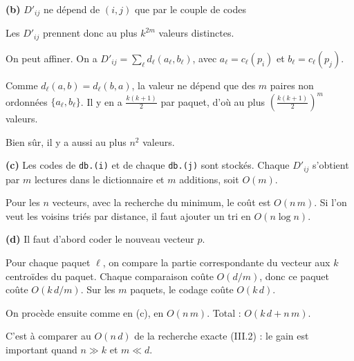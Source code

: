\documentclass[11pt,a4paper]{article}
\newcommand{\equationajustee}[1]{%
  \sbox{\boiteequation}{$\displaystyle #1$}%
  \ifdim\wd\boiteequation>\linewidth
    \[\resizebox{\linewidth}{!}{\usebox{\boiteequation}}\]%
  \else
    \[#1\]%
  \fi}
\begin{document}
\textbf{(b)} \(D'_{ij}\) ne dépend de \((i,j)\) que par le couple de codes

\equationajustee{\big(q(p_i),q(p_j)\big)\in[k]^m\times[k]^m.}

Les \(D'_{ij}\) prennent donc au plus \(\boxed{k^{2m}}\) valeurs distinctes.

On peut affiner. On a \(D'_{ij}=\sum_\ell d_\ell(a_\ell,b_\ell)\), avec \(a_\ell=c_\ell(p_i)\) et \(b_\ell=c_\ell(p_j)\).

Comme \(d_\ell(a,b)=d_\ell(b,a)\), la valeur ne dépend que des \(m\) paires non ordonnées \(\{a_\ell,b_\ell\}\). Il y en a \(\frac{k(k+1)}2\) par paquet, d'où au plus \(\left(\frac{k(k+1)}{2}\right)^m\) valeurs.

Bien sûr, il y a aussi au plus \(n^2\) valeurs.

\textbf{(c)} Les codes de \texttt{db.(i)} et de chaque \texttt{db.(j)} sont stockés. Chaque \(D'_{ij}\) s'obtient par \(m\) lectures dans le dictionnaire et \(m\) additions, soit \(O(m)\).

Pour les \(n\) vecteurs, avec la recherche du minimum, le coût est \(\boxed{O(n\,m)}\). Si l'on veut les voisins triés par distance, il faut ajouter un tri en \(O(n\log n)\).

\textbf{(d)} Il faut d'abord coder le nouveau vecteur \(p\).

Pour chaque paquet \(\ell\), on compare la partie correspondante du vecteur aux \(k\) centroïdes du paquet. Chaque comparaison coûte \(O(d/m)\), donc ce paquet coûte \(O(k\,d/m)\). Sur les \(m\) paquets, le codage coûte \(O(k\,d)\).

On procède ensuite comme en (c), en \(O(n\,m)\). Total : \(\boxed{O(k\,d+n\,m)}\).

C'est à comparer au \(O(n\,d)\) de la recherche exacte (III.2) : le gain est important quand \(n\gg k\) et \(m\ll d\).
\end{document}
